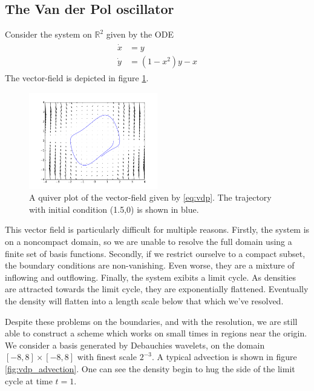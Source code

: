 \documentclass[letterpaper, 12 pt]{amsart}
\newcommand{\R}{\mathbb{R}}
\begin{document}
\subsection{The Van der Pol oscillator}
Consider the system on $\R^2$ given by the ODE
\begin{align}
  \begin{split}
    \dot{x} &= y \\
    \dot{y} &= (1-x^2)y-x
   \end{split} \label{eq:vdp}
\end{align}
The vector-field is depicted in figure \ref{fig:vdp_quiver}.
\begin{figure}[p]
  \centering
  \includegraphics[width=0.5\textwidth]{./images/vdp_traj.png}
  \caption{A quiver plot of the vector-field given by \eqref{eq:vdp}.  The trajectory with initial condition (1.5,0) is shown in blue.}
  \label{fig:vdp_quiver}
\end{figure}

This vector field is particularly difficult for multiple reasons.
Firstly, the system is on a noncompact domain, so we are unable to
resolve the full domain using a finite set of basis functions.
Secondly, if we restrict ourselve to a compact subset, the boundary conditions are non-vanishing.  Even worse, they are a mixture of inflowing
and outflowing.
Finally, the system exibits a limit cycle.
As densities are attracted towards the limit cycle, they are 
exponentially flattened.  Eventually the density will flatten 
into a length scale below that which we've resolved.

Despite these problems on the boundaries, and with the resolution,
we are still able to construct a scheme which works on small times
in regions near the origin.
We consider a basis generated by Debauchies wavelets,
on the domain $[-8,8] \times [-8,8]$ with finest scale $2^{-3}$.
A typical advection is shown in 
figure \ref{fig:vdp_advection}.
One can see the density begin to hug the side of the limit cycle
at time $t=1$.
\end{document}
